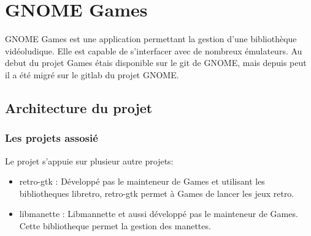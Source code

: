 \documentclass[12pt]{report}
\begin{document}
\newpage
\chapter{GNOME Games}
GNOME Games est une application permettant la gestion d'une
bibliothèque vidéoludique. Elle est capable de s'interfacer avec de
nombreux émulateurs.
Au debut du projet Games étais disponible sur le git de GNOME, mais 
depuis peut il a été migré sur le gitlab du projet GNOME.

\section{Architecture du projet}
\subsection{Les projets assosié}
Le projet s'appuie sur plusieur autre projets:
\begin{itemize}
\item retro-gtk : Développé pas le mainteneur de Games et utilisant les bibliotheques libretro,
retro-gtk permet à Games de lancer les jeux retro.
\item libmanette : Libmannette et aussi développé pas le mainteneur de Games. Cette bibliotheque
permet la gestion des manettes.
\end{itemize}

\end{document}
